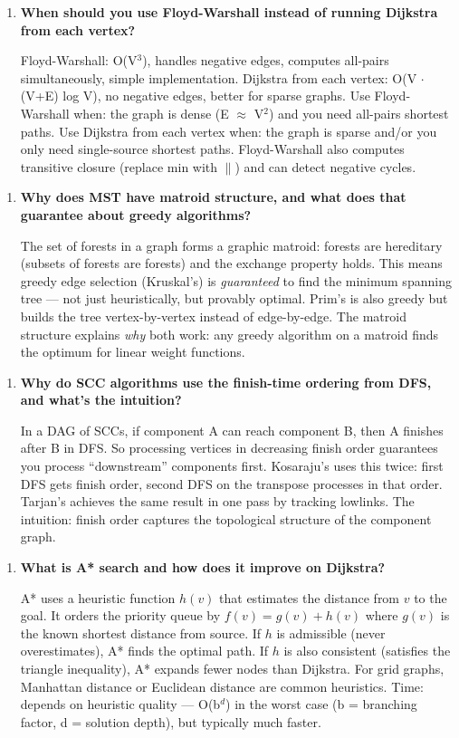 \begin{enumerate}
\item \textbf{When should you use Floyd-Warshall instead of running Dijkstra from each vertex?}

Floyd-Warshall: O(V$^{3}$), handles negative edges, computes all-pairs simultaneously, simple implementation. Dijkstra from each vertex: O(V $\cdot$ (V+E) log V), no negative edges, better for sparse graphs. Use Floyd-Warshall when: the graph is dense (E $\approx$ V$^{2}$) and you need all-pairs shortest paths. Use Dijkstra from each vertex when: the graph is sparse and/or you only need single-source shortest paths. Floyd-Warshall also computes transitive closure (replace min with $\|$) and can detect negative cycles.
\end{enumerate}

\begin{enumerate}
\item \textbf{Why does MST have matroid structure, and what does that guarantee about greedy algorithms?}

The set of forests in a graph forms a graphic matroid: forests are hereditary (subsets of forests are forests) and the exchange property holds. This means greedy edge selection (Kruskal's) is \emph{guaranteed} to find the minimum spanning tree --- not just heuristically, but provably optimal. Prim's is also greedy but builds the tree vertex-by-vertex instead of edge-by-edge. The matroid structure explains \emph{why} both work: any greedy algorithm on a matroid finds the optimum for linear weight functions.
\end{enumerate}

\begin{enumerate}
\item \textbf{Why do SCC algorithms use the finish-time ordering from DFS, and what's the intuition?}

In a DAG of SCCs, if component A can reach component B, then A finishes after B in DFS. So processing vertices in decreasing finish order guarantees you process ``downstream'' components first. Kosaraju's uses this twice: first DFS gets finish order, second DFS on the transpose processes in that order. Tarjan's achieves the same result in one pass by tracking lowlinks. The intuition: finish order captures the topological structure of the component graph.
\end{enumerate}

\begin{enumerate}
\item \textbf{What is A* search and how does it improve on Dijkstra?}

A* uses a heuristic function $h(v)$ that estimates the distance from $v$ to the goal. It orders the priority queue by $f(v) = g(v) + h(v)$ where $g(v)$ is the known shortest distance from source. If $h$ is admissible (never overestimates), A* finds the optimal path. If $h$ is also consistent (satisfies the triangle inequality), A* expands fewer nodes than Dijkstra. For grid graphs, Manhattan distance or Euclidean distance are common heuristics. Time: depends on heuristic quality — O(b$^{d}$) in the worst case (b = branching factor, d = solution depth), but typically much faster.
\end{enumerate}

